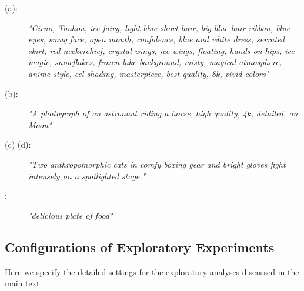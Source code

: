 \begin{description}
    \item[ (a):]
    \textit{"Cirno, Touhou, ice fairy, light blue short hair, big blue hair ribbon, blue eyes, smug face, open mouth, confidence, blue and white dress, serrated skirt, red neckerchief, crystal wings, ice wings, floating, hands on hips, ice magic, snowflakes, frozen lake background, misty, magical atmosphere, anime style, cel shading, masterpiece, best quality, 8k, vivid colors"}

    \item[ (b):]
    \textit{"A photograph of an astronaut riding a horse, high quality, 4k, detailed, on Moon"}

    \item[ (c) (d):]
    \textit{"Two anthropomorphic cats in comfy boxing gear and bright gloves fight intensely on a spotlighted stage."}

    \item[:]
    \textit{"delicious plate of food"}
\end{description}


\subsection{Configurations of Exploratory Experiments}
\label{app:config_explore}

Here we specify the detailed settings for the exploratory analyses discussed in the main text.

